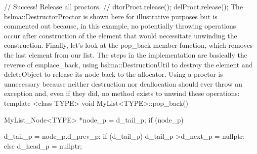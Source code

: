 {{{{{{{{{    // Success!  Release all proctors.
    // dtorProct.release();
    delProct.release();
}
The bslma::DestructorProctor is shown here for illustrative purposes but is commented out because, in this example, no potentially throwing operations occur after construction of the element that would necessitate unwinding the construction.
Finally, let’s look at the pop_back member function, which removes the last element from our list. The steps in the implementation are basically the reverse of emplace_back, using bslma::DestructionUtil to destroy the element and deleteObject to release its node back to the allocator.  Using a proctor is unnecessary because neither destruction nor deallocation should ever throw an exception and, even if they did, no method exists to unwind these operations:
template <class TYPE>
void MyList<TYPE>::pop_back()
{
    MyList_Node<TYPE> *node_p = d_tail_p;
    if (node_p) {
        d_tail_p = node_p.d_prev_p;
        if (d_tail_p) {
            d_tail_p->d_next_p = nullptr;
        }
        else {
            d_head_p = nullptr;
        }

}}}}}}}}}}
